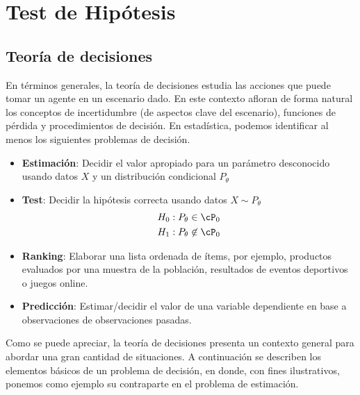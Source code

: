 

\chapter{Test de Hipótesis}


\section{Teoría de decisiones}
\label{sec:teoría_de_decisiones}

En términos generales, la teoría de decisiones estudia las acciones que puede tomar un agente en un escenario dado. En este contexto afloran de forma natural los conceptos de incertidumbre (de aspectos clave del escenario), funciones de pérdida y procedimientos de decisión. En estadística, podemos identificar al menos los siguientes problemas de decisión.


\begin{itemize}
	\item \textbf{Estimación}: Decidir el valor apropiado para un parámetro desconocido usando datos $X$ y un distribución condicional $P_\theta$
	\item \textbf{Test}: Decidir la hipótesis correcta usando datos $X\sim P_\theta$
	\begin{align}
		H_0: P_\theta\in\cP_0\\
		H_1: P_\theta\not\in\cP_0
	\end{align}
	\item \textbf{Ranking}: Elaborar una lista ordenada de ítems, por ejemplo, productos evaluados por una muestra de la población, resultados de eventos deportivos o juegos online. 
	\item \textbf{Predicción}: Estimar/decidir el valor de una variable dependiente en base a observaciones de observaciones pasadas. 
\end{itemize}

Como se puede apreciar, la teoría de decisiones presenta un contexto general para abordar una gran cantidad de situaciones. A continuación se describen los elementos básicos de un problema de decisión, en donde, con fines ilustrativos, ponemos como ejemplo su contraparte en el problema de estimación.

